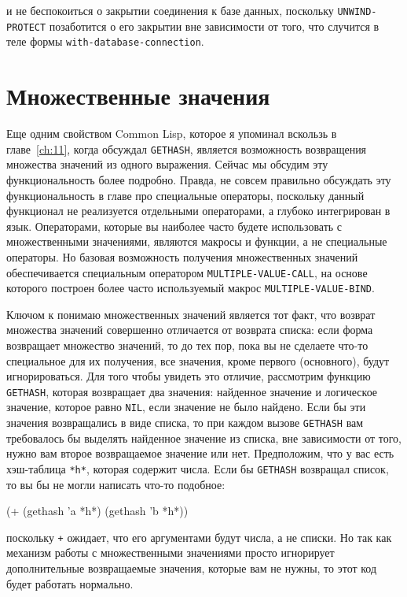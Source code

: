 \noindent{}и не беспокоиться о закрытии соединения к базе данных, поскольку \lstinline{UNWIND-PROTECT}
позаботится о его закрытии вне зависимости от того, что случится в теле формы
\lstinline{with-database-connection}.

\section{Множественные значения}

Еще одним свойством Common Lisp, которое я упоминал вскользь в главе~\ref{ch:11}, когда
обсуждал \lstinline{GETHASH}, является возможность возвращения множества значений из одного
выражения. Сейчас мы обсудим эту функциональность более подробно. Правда, не совсем
правильно обсуждать эту функциональность в главе про специальные операторы, поскольку данный
функционал не реализуется отдельными операторами, а глубоко интегрирован в
язык. Операторами, которые вы наиболее часто будете использовать с множественными
значениями, являются макросы и функции, а не специальные операторы.  Но базовая
возможность получения множественных значений обеспечивается специальным оператором
\lstinline{MULTIPLE-VALUE-CALL}, на основе которого построен более часто используемый макрос
\lstinline{MULTIPLE-VALUE-BIND}.

Ключом к понимаю множественных значений является тот факт, что возврат множества значений
совершенно отличается от возврата списка: если форма возвращает множество значений, то
до тех пор, пока вы не сделаете что-то специальное для их получения, все значения, кроме
первого (основного), будут игнорироваться.  Для того чтобы увидеть это отличие, рассмотрим
функцию \lstinline{GETHASH}, которая возвращает два значения: найденное значение и логическое
значение, которое равно \lstinline{NIL}, если значение не было найдено.  Если бы эти значения
возвращались в виде списка, то при каждом вызове \lstinline{GETHASH} вам требовалось бы
выделять найденное значение из списка, вне зависимости от того, нужно вам второе
возвращаемое значение или нет.  Предположим, что у вас есть хэш-таблица \lstinline{*h*},
которая содержит числа.  Если бы \lstinline{GETHASH} возвращал список, то вы бы не могли
написать что-то подобное:

\begin{myverb}
(+ (gethash 'a *h*) (gethash 'b *h*))
\end{myverb}

\noindent{}поскольку \lstinline{+} ожидает, что его аргументами будут числа, а не
списки. Но так как механизм работы с множественными значениями просто игнорирует
дополнительные возвращаемые значения, которые вам не нужны, то этот код будет работать
нормально.

